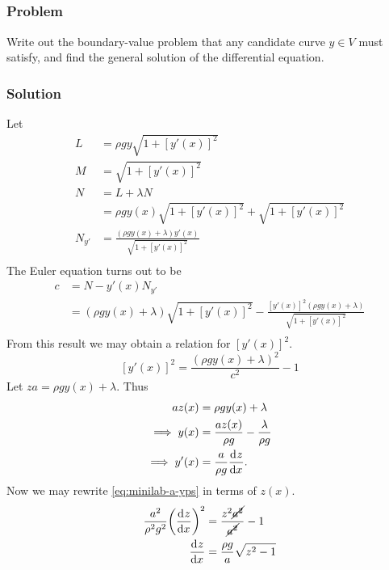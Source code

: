 \documentclass[12pt,twoside]{article}
\begin{document}
\subsection{}
\subsubsection*{Problem}
\label{sec:minilab-a}
Write out the boundary-value problem that any candidate curve $y\in V$ must
satisfy, and find the general solution of the differential equation.

\subsubsection*{Solution}
Let
\begin{align*}
  L &= \rho g y \sqrt{1+{[y'(x)]}^2} \\
  M &= \sqrt{1+{[y'(x)]}^2} \\
  N &= L + \lambda N \\
    &= \rho g y(x)\sqrt{1+{[y'(x)]}^2} + \sqrt{1+{[y'(x)]}^2} \\
  N_{y'} &= \frac{(\rho g y(x) + \lambda) y'(x)}{\sqrt{1+{[y'(x)]}^2}} \\
\end{align*}
The Euler equation turns out to be
\begin{align*}
  c &= N - y'(x)N_{y'} \\
    &= (\rho g y(x) + \lambda)\sqrt{1+{[y'(x)]}^2} -
      \frac{{[y'(x)]}^2(\rho g y(x) + \lambda)}{\sqrt{1+{[y'(x)]}^2}} \\
\end{align*}
From this result we may obtain a relation for ${[y'(x)]}^2$.
\begin{equation}
  \label{eq:minilab-a-yps}
  {[y'(x)]}^2 = \frac{{(\rho g y(x) + \lambda)}^2}{c^2} - 1
\end{equation}
Let $za = \rho g y(x) + \lambda$. Thus
\begin{align*}
  az(x) &= \rho g y(x) + \lambda \\
  \implies y(x) &= \frac{az(x)}{\rho g} - \frac{\lambda}{\rho g} \\
  \implies y'(x) &= \frac{a}{\rho g} \frac{\mathrm{d}^{} {z}}{\mathrm{d}{x}^{}}.
\end{align*}
Now we may rewrite \cref{eq:minilab-a-yps} in terms of $z(x)$.
\begin{align*}
  \frac{a^2}{\rho^2g^2}{\left( \frac{\mathrm{d}^{} {z}}{\mathrm{d}{x}^{}} \right)}^2
  &= \frac{z^2\cancel{a^2}}{\cancel{a^2}} - 1 \\
  \frac{\mathrm{d}^{} {z}}{\mathrm{d}{x}^{}} &= \frac{\rho g }{a}\sqrt{z^2-1} \\
\end{align*}
\end{document}
